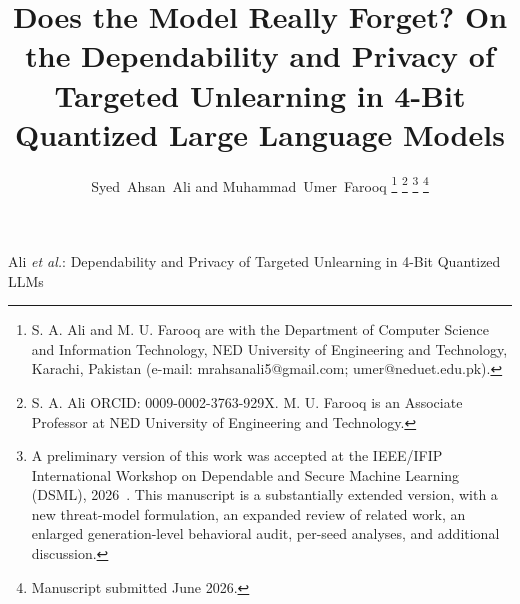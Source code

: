 \documentclass[journal]{IEEEtran}
\begin{document}
\title{Does the Model Really Forget? On the Dependability and Privacy of Targeted Unlearning in 4-Bit Quantized Large Language Models}

\author{Syed~Ahsan~Ali and Muhammad~Umer~Farooq%
\thanks{S. A. Ali and M. U. Farooq are with the Department of Computer Science and
Information Technology, NED University of Engineering and Technology, Karachi,
Pakistan (e-mail: mrahsanali5@gmail.com; umer@neduet.edu.pk).}%
\thanks{S. A. Ali ORCID: 0009-0002-3763-929X. M. U. Farooq is an Associate Professor at NED University of Engineering and Technology.}%
\thanks{A preliminary version of this work was accepted at the IEEE/IFIP International Workshop on Dependable and Secure Machine Learning (DSML), 2026~\cite{ali2026dsml}. This manuscript is a substantially extended version, with a new threat-model formulation, an expanded review of related work, an enlarged generation-level behavioral audit, per-seed analyses, and additional discussion.}%
\thanks{Manuscript submitted June 2026.}}

%
{Ali \MakeLowercase{\textit{et al.}}: Dependability and Privacy of Targeted Unlearning in 4-Bit Quantized LLMs}

\maketitle
\end{document}
